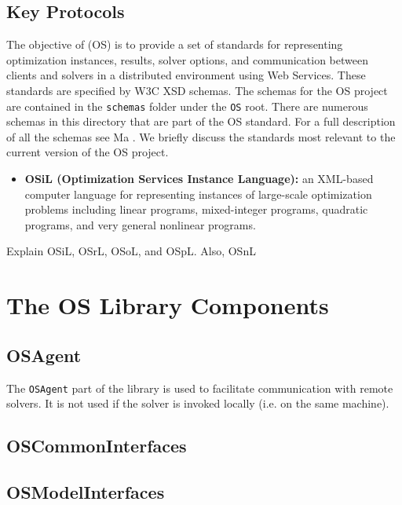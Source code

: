 \documentclass[11pt]{article}
\renewcommand{\_}{{\char"5F}}
\renewcommand{\{}{{\char"7B}}
\renewcommand{\}}{{\char"7D}}
\renewcommand{\^}{{\char"0D}}
\renewcommand{\'}{{\char"0D}}
\begin{document}
\subsection{Key Protocols}\label{section:schemadescriptions}

The objective of  (OS) is to provide a set of standards for representing optimization instances, results, solver options, and communication between clients and solvers in a distributed environment using Web Services.  These standards are specified by W3C XSD schemas. The schemas for the OS project are contained in the {\tt schemas} folder under the {\tt OS} root. There are numerous schemas in this directory that are part of the OS standard. For a full description of all the schemas see  Ma \cite{junma2005}.  We briefly discuss the standards most relevant to the current version of the OS project. 

\begin{itemize}


\item[] {\bf OSiL (Optimization Services Instance Language):} an
XML-based computer language for representing instances of large-scale
optimization problems including linear programs, mixed-integer programs,
quadratic programs, and very general nonlinear programs.




\end{itemize}

Explain OSiL, OSrL, OSoL, and OSpL. Also, OSnL

\section{The OS Library Components}\label{section:oslibrary}

\subsection{OSAgent}\label{section:osagent}

The {\tt OSAgent}  part of the library is used to facilitate communication with remote solvers. It is not used if the solver is invoked locally (i.e. on the same machine). 

\subsection{OSCommonInterfaces}

\subsection{OSModelInterfaces}\label{section:osmodelinterfaces}
\end{document}
